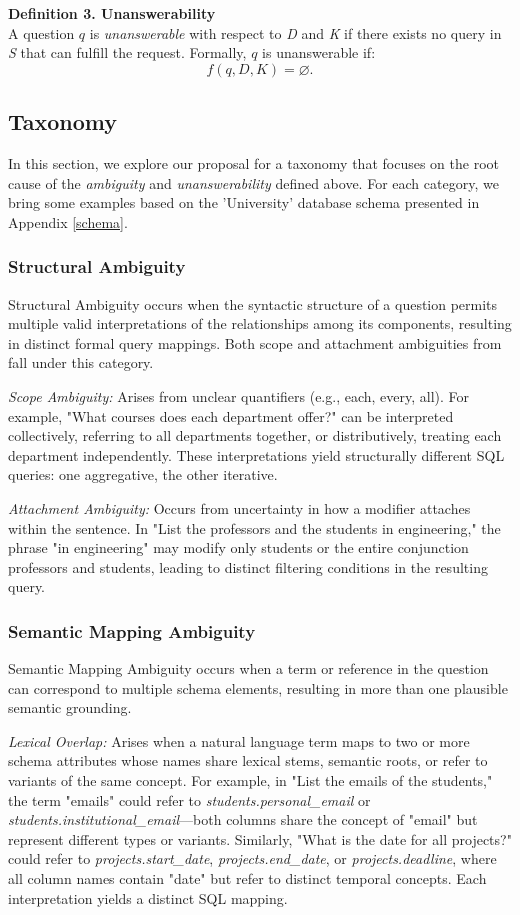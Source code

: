 \textbf{Definition 3. Unanswerability} \\
A question \(q\) is \textit{unanswerable} with respect to \textit{D} and \textit{K} if there exists no query in \textit{S} that can fulfill the request. Formally, \(q\) is unanswerable if:
\[
f(q, D, K) = \varnothing.
\]

\subsection{Taxonomy}
In this section, we explore our proposal for a taxonomy that focuses on the root cause of the \textit{ambiguity} and \textit{unanswerability} defined above. For each category, we bring some examples based on the 'University' database schema presented in Appendix \ref{schema}.

\subsubsection{Structural Ambiguity}
Structural Ambiguity occurs when the syntactic structure of a question permits multiple valid interpretations of the relationships among its components, resulting in distinct formal query mappings. Both scope and attachment ambiguities from \cite{Ambrosia} fall under this category.

\textit{Scope Ambiguity:} Arises from unclear quantifiers (e.g., each, every, all). For example, "What courses does each department offer?" can be interpreted collectively, referring to all departments together, or distributively, treating each department independently. These interpretations yield structurally different SQL queries: one aggregative, the other iterative.

\textit{Attachment Ambiguity:} Occurs from uncertainty in how a modifier attaches within the sentence. In "List the professors and the students in engineering," the phrase "in engineering" may modify only students or the entire conjunction professors and students, leading to distinct filtering conditions in the resulting query.

\subsubsection{Semantic Mapping Ambiguity}
Semantic Mapping Ambiguity occurs when a term or reference in the question can correspond to multiple schema elements, resulting in more than one plausible semantic grounding.

\textit{Lexical Overlap:} Arises when a natural language term maps to two or more schema attributes whose names share lexical stems, semantic roots, or refer to variants of the same concept. For example, in "List the emails of the students," the term "emails" could refer to \textit{students.personal\_email} or \textit{students.institutional\_email}—both columns share the concept of "email" but represent different types or variants. Similarly, "What is the date for all projects?" could refer to \textit{projects.start\_date}, \textit{projects.end\_date}, or \textit{projects.deadline}, where all column names contain "date" but refer to distinct temporal concepts. Each interpretation yields a distinct SQL mapping.

